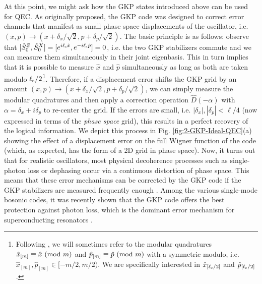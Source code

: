At this point, we might ask how the GKP states introduced above can be used for QEC. As originally proposed, the GKP code was designed to correct error channels that manifest as small phase space displacements of the oscillator, i.e. $(x, p) \to (x + \delta_x/\sqrt{2}, p+\delta_p/\sqrt{2})$. The basic principle is as follows: observe that $[\hat{S}_0^Z, \hat{S}_0^X] = [e^{i\ell_{\rm s}\hat{x}}, e^{-i\ell_{\rm s}\hat{p}}] = 0$, i.e. the two GKP stabilizers commute and we can measure them simultaneously in their joint eigenbasis. This in turn implies that it is possible to measure $\hat{x}$ and $\hat{p}$ simultaneously as long as both are taken modulo $\ell_{\rm s}/2$\footnote{Following \cite{royer2020gkp}, we will sometimes refer to the modular quadratures $\hat{x}_{[m]} \equiv \hat{x} \ (\mathrm{mod}\ m)$ and $\hat{p}_{[m]} \equiv \hat{p} \ (\mathrm{mod}\ m)$ with a symmetric modulo, i.e. $\hat{x}_{[m]}, \hat{p}_{[m]} \in [-m/2, m/2)$. We are specifically interested in $\hat{x}_{[\ell_{\rm s}/2]}$ and $\hat{p}_{[\ell_{\rm s}/2]}$.}. Therefore, if a displacement error shifts the GKP grid by an amount $(x, p) \to (x + \delta_x/\sqrt{2}, p+\delta_p/\sqrt{2})$, we can simply measure the modular quadratures and then apply a correction operation $\hat{D}(-\alpha)$ with $\alpha = \delta_x + i\delta_p$ to re-center the grid. If the errors are small, i.e. $|\delta_x|, |\delta_p| < \ell / 4$ (now expressed in terms of the \textit{phase space} grid), this results in a perfect recovery of the logical information. We depict this process in Fig. \ref{fig:2-GKP-Ideal-QEC}(a) showing the effect of a displacement error on the full Wigner function of the code (which, as expected, has the form of a 2D grid in phase space). Now, it turns out that for realistic oscillators, most physical decoherence processes such as single-photon loss or dephasing occur via a continuous distortion of phase space. This means that these error mechanisms can be corrected by the GKP code if the GKP stabilizers are measured frequently enough \cite{gottesman2001gkp, glancy2006gkperror, albert2018performance-and-structure, noh2018performance-and-structure-pt2}. Among the various single-mode bosonic codes, it was recently shown that the GKP code offers the best protection against photon loss, which is the dominant error mechanism for superconducting resonators \cite{albert2018performance-and-structure}. 
